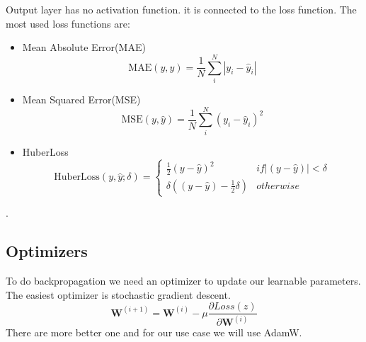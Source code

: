 Output layer has no activation function. it is connected to the loss function. The most used loss functions are:
\begin{itemize}
	\item Mean Absolute Error(MAE)
	\begin{equation}
		\text{MAE}(y,\hat{y}) = \frac{1}{N}\sum^N_i \left|y_i-\hat{y}_i\right|
	\end{equation}
	
	\item Mean Squared Error(MSE)
	\begin{equation}
		\text{MSE}(y,\hat{y}) = \frac{1}{N}\sum^N_i \left(y_i-\hat{y}_i\right)^2
	\end{equation}
	
	\item HuberLoss
	\begin{equation}
		\text{HuberLoss}(y,\hat{y};\delta) = \left\{\begin{matrix}
			\frac{1}{2}(y - \hat{y})^{2} & if \left | (y - \hat{y})  \right | < \delta\\
			\delta ((y - \hat{y}) - \frac1 2 \delta) & otherwise
		\end{matrix}\right.
	\end{equation}
	
\end{itemize}.

\subsection{Optimizers}
To do backpropagation we need an optimizer to update our learnable parameters. The easiest optimizer is stochastic gradient descent.
\begin{equation}
	\mathbf{W}^{(i+1)} =\mathbf{W}^{(i)}-\mu \frac{\partial Loss(z)}{\partial \mathbf{W}^{(i)}}
\end{equation}
There are more better one and for our use case we will use AdamW\cite{adamW}.


